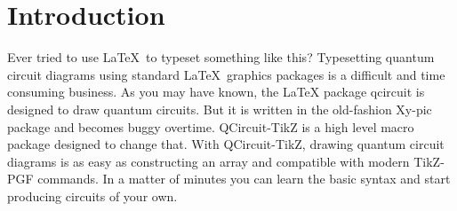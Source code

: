 \documentclass[twocolumn,nofootinbib,aps,,pra]{revtex4-1}
\begin{document}
\section{Introduction}
\setcounter{footnote}{1}
Ever tried to use \LaTeX\ to typeset something like this?
%
Typesetting quantum circuit diagrams using standard \LaTeX\ graphics packages is a difficult and time consuming business. 
As you may have known, the LaTeX package qcircuit is designed to draw quantum circuits.
But it is written in the old-fashion Xy-pic package and becomes buggy overtime.
QCircuit-TikZ is a high level macro package designed to change that. 
With QCircuit-TikZ, drawing quantum circuit diagrams is as easy as constructing an array and compatible with modern TikZ-PGF commands. 
In a matter of minutes you can learn the basic syntax and start producing circuits of your own.
\end{document}
